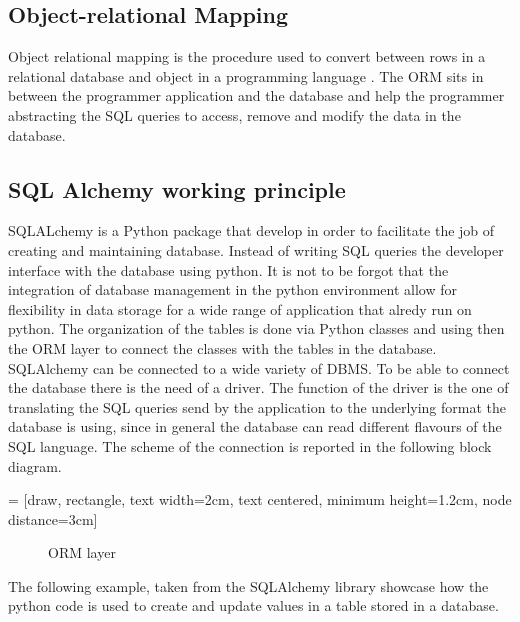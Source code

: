 \documentclass[../main.tex]{subfiles}
\begin{document}
\subsection{Object-relational Mapping}
Object relational mapping is the procedure used to convert between rows in a relational database and object in a programming language \cite{10.1145/1376616.1376773}. The \gls{ORM} sits in between the programmer application and the database and help the programmer abstracting the SQL queries to access, remove and modify the data in the database. 
\subsection{SQL Alchemy working principle}
SQLALchemy is a Python package that develop in order to facilitate the job of creating and maintaining database. Instead of writing SQL queries the developer interface with the database using python. It is not to be forgot that the integration of database management in the python environment allow for flexibility in data storage for a wide range of application that alredy run on python. The organization of the tables is done via Python classes and using then the ORM layer to connect the classes with the tables in the database.\\
SQLAlchemy can be connected to a wide variety of DBMS. To be able to connect the database there is the need of a driver. The function of the driver is the one of translating the SQL queries send by the application to the underlying format the database is using, since in general the database can read different flavours of the SQL language. The scheme of the connection is reported in the following block diagram. 

 = [draw, rectangle, text width=2cm, text centered, minimum height=1.2cm, node distance=3cm]
\begin{figure}[h]
  \centering
{}
  \caption{ORM layer}
  \label{ormlayer}
\end{figure}
The following example, taken from the SQLAlchemy library showcase how the python code is used to create and update values in a table stored in a database. 
\end{document}
